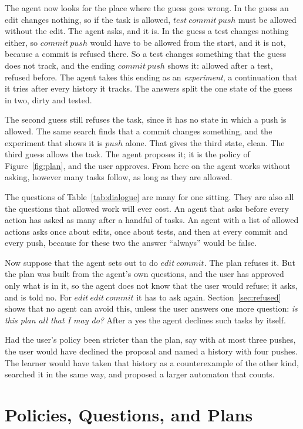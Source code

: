 \documentclass[acmsmall,nonacm,screen]{acmart}
\newcommand{\nm}[1]{\mathit{#1}}
\newcommand{\edit}{\nm{edit}}
\newcommand{\test}{\nm{test}}
\newcommand{\commit}{\nm{commit}}
\newcommand{\push}{\nm{push}}
\begin{document}
The agent now looks for the place where the guess goes wrong. In the guess an edit changes
nothing, so if the task is allowed, $\test\ \commit\ \push$ must be allowed without the edit.
The agent asks, and it is. In the guess a test changes nothing either, so $\commit\ \push$
would have to be allowed from the start, and it is not, because a commit is refused there. So
a test changes something that the guess does not track, and the ending $\commit\ \push$ shows
it: allowed after a test, refused before. The agent takes this ending as an
\emph{experiment}, a continuation that it tries after every history it tracks. The answers
split the one state of the guess in two, dirty and tested.

The second guess still refuses the task, since it has no state in which a push is allowed.
The same search finds that a commit changes something, and the experiment that shows it is
$\push$ alone. That gives the third state, clean. The third guess allows the task. The agent
proposes it; it is the policy of Figure~\ref{fig:plan}, and the user approves. From here on
the agent works without asking, however many tasks follow, as long as they are allowed.

The questions of Table~\ref{tab:dialogue} are many for one sitting. They are also all the
questions that allowed work will ever cost. An agent that asks before every action has
asked as many after a handful of tasks. An agent with a list of allowed actions asks once
about edits, once about tests, and then at every commit and every push, because for these
two the answer ``always'' would be false.

Now suppose that the agent sets out to do $\edit\ \commit$. The plan refuses it. But the
plan was built from the agent's own questions, and the user has approved only what is in it,
so the agent does not know that the user would refuse; it asks, and is told no. For
$\edit\ \edit\ \commit$ it has to ask again. Section~\ref{sec:refused} shows that no agent
can avoid this, unless the user answers one more question: \emph{is this plan all that I may
do?} After a yes the agent declines such tasks by itself.

Had the user's policy been stricter than the plan, say with at most three pushes, the user
would have declined the proposal and named a history with four pushes. The learner would
have taken that history as a counterexample of the other kind, searched it in the same way,
and proposed a larger automaton that counts.

\section{Policies, Questions, and Plans}
\label{sec:model}
\end{document}
